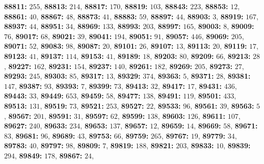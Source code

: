 \textsf{\bfseries 88811:} $255$, \textsf{\bfseries 88813:} $214$, \textsf{\bfseries 88817:} $170$, \textsf{\bfseries 88819:} $103$, \textsf{\bfseries 88843:} $223$, \textsf{\bfseries 88853:} $12$, \textsf{\bfseries 88861:} $40$, \textsf{\bfseries 88867:} $48$, \textsf{\bfseries 88873:} $41$, \textsf{\bfseries 88883:} $59$, \textsf{\bfseries 88897:} $44$, \textsf{\bfseries 88903:} $3$, \textsf{\bfseries 88919:} $167$, \textsf{\bfseries 88937:} $44$, \textsf{\bfseries 88951:} $34$, \textsf{\bfseries 88969:} $133$, \textsf{\bfseries 88993:} $203$, \textsf{\bfseries 88997:} $165$, \textsf{\bfseries 89003:} $8$, \textsf{\bfseries 89009:} $76$, \textsf{\bfseries 89017:} $68$, \textsf{\bfseries 89021:} $39$, \textsf{\bfseries 89041:} $194$, \textsf{\bfseries 89051:} $91$, \textsf{\bfseries 89057:} $446$, \textsf{\bfseries 89069:} $205$, \textsf{\bfseries 89071:} $52$, \textsf{\bfseries 89083:} $98$, \textsf{\bfseries 89087:} $20$, \textsf{\bfseries 89101:} $26$, \textsf{\bfseries 89107:} $13$, \textsf{\bfseries 89113:} $20$, \textsf{\bfseries 89119:} $17$, \textsf{\bfseries 89123:} $41$, \textsf{\bfseries 89137:} $114$, \textsf{\bfseries 89153:} $41$, \textsf{\bfseries 89189:} $18$, \textsf{\bfseries 89203:} $80$, \textsf{\bfseries 89209:} $66$, \textsf{\bfseries 89213:} $28$, \textsf{\bfseries 89227:} $162$, \textsf{\bfseries 89231:} $154$, \textsf{\bfseries 89237:} $140$, \textsf{\bfseries 89261:} $182$, \textsf{\bfseries 89269:} $205$, \textsf{\bfseries 89273:} $27$, \textsf{\bfseries 89293:} $245$, \textsf{\bfseries 89303:} $85$, \textsf{\bfseries 89317:} $13$, \textsf{\bfseries 89329:} $374$, \textsf{\bfseries 89363:} $5$, \textsf{\bfseries 89371:} $28$, \textsf{\bfseries 89381:} $147$, \textsf{\bfseries 89387:} $93$, \textsf{\bfseries 89393:} $7$, \textsf{\bfseries 89399:} $73$, \textsf{\bfseries 89413:} $32$, \textsf{\bfseries 89417:} $17$, \textsf{\bfseries 89431:} $436$, \textsf{\bfseries 89443:} $33$, \textsf{\bfseries 89449:} $653$, \textsf{\bfseries 89459:} $58$, \textsf{\bfseries 89477:} $138$, \textsf{\bfseries 89491:} $119$, \textsf{\bfseries 89501:} $433$, \textsf{\bfseries 89513:} $131$, \textsf{\bfseries 89519:} $73$, \textsf{\bfseries 89521:} $253$, \textsf{\bfseries 89527:} $22$, \textsf{\bfseries 89533:} $96$, \textsf{\bfseries 89561:} $39$, \textsf{\bfseries 89563:} $5$, \textsf{\bfseries 89567:} $201$, \textsf{\bfseries 89591:} $31$, \textsf{\bfseries 89597:} $62$, \textsf{\bfseries 89599:} $138$, \textsf{\bfseries 89603:} $126$, \textsf{\bfseries 89611:} $107$, \textsf{\bfseries 89627:} $240$, \textsf{\bfseries 89633:} $234$, \textsf{\bfseries 89653:} $137$, \textsf{\bfseries 89657:} $12$, \textsf{\bfseries 89659:} $14$, \textsf{\bfseries 89669:} $58$, \textsf{\bfseries 89671:} $83$, \textsf{\bfseries 89681:} $96$, \textsf{\bfseries 89689:} $43$, \textsf{\bfseries 89753:} $66$, \textsf{\bfseries 89759:} $265$, \textsf{\bfseries 89767:} $19$, \textsf{\bfseries 89779:} $34$, \textsf{\bfseries 89783:} $40$, \textsf{\bfseries 89797:} $98$, \textsf{\bfseries 89809:} $7$, \textsf{\bfseries 89819:} $188$, \textsf{\bfseries 89821:} $203$, \textsf{\bfseries 89833:} $10$, \textsf{\bfseries 89839:} $294$, \textsf{\bfseries 89849:} $178$, \textsf{\bfseries 89867:} $24$, 
